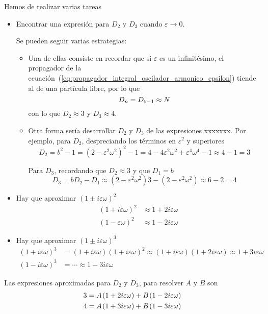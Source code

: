 Hemos de realizar varias tareas
\begin{itemize}
\item Encontrar una expresión para $D_2$ y $D_3$ cuando
  $\varepsilon \rightarrow 0$.

  Se pueden seguir varias estrategias:
  \begin{itemize}
  \item Una de ellas consiste en recordar que si $\varepsilon$ es un
    infinitésimo, el propagador de la
    ecuación~(\ref{eq:propagador_integral_oscilador_armonico_epsilon})
    tiende al de una partícula libre, por lo que
    \[
      D_n = D_{\textsc{n}-1} \approx N
    \]
    con lo que $D_2\approx 3$ y $D_3\approx 4$.

    \item
    Otra forma sería desarrollar $D_2$ y $D_3$ de las expresiones xxxxxxx.
    Por ejemplo, para $D_2$, despreciando los términos en
    $\varepsilon^2$ y superiores
    \[
      D_2 = b^2 - 1 = (2-\varepsilon^2\omega^2)^2-1
      = 4 -4\varepsilon^2\omega^2 + \varepsilon^4\omega^4 -1 
      \approx
      4 - 1
      = 3
    \]

    Para $D_3$, recordando que $D_2\approx 3$ y que $D_1= b$
    \[
      D_3
      = b D_2 - D_1
      \approx
      (2-\varepsilon^2\omega^2) 3 - (2-\varepsilon^2\omega^2)
      \approx
      6 - 2
      = 4
    \]
  \end{itemize}

\item Hay que aproximar $(1\pm i\varepsilon\omega)^2$
  \begin{align*}
    (1+i\varepsilon\omega)^2
    &\approx
    1 + 2i\varepsilon\omega\\
    (1-\varepsilon\omega)^2
    &\approx
    1 - 2i\varepsilon\omega
  \end{align*}

\item Hay que aproximar $(1\pm i\varepsilon\omega)^3$
  \begin{align*}
    (1+i\varepsilon\omega)^3
    &= (1+i\varepsilon\omega) (1+i\varepsilon\omega)^2
    \approx (1+i\varepsilon\omega) (1+2i\varepsilon\omega)
      \approx 1+3i\varepsilon\omega\\
    (1-i\varepsilon\omega)^3
    &= \cdots
    \approx
    1-3i\varepsilon\omega
  \end{align*}
\end{itemize}

Las expresiones aproximadas para $D_2$ y $D_3$, para resolver $A$ y $B$ son
  \begin{align*}
    3 &= A\kern1pt (1+2i\varepsilon\omega) + B\kern1pt (1-2i\varepsilon\omega)\\
    4 &= A\kern1pt (1+3i\varepsilon\omega) + B\kern1pt (1-3i\varepsilon\omega)
  \end{align*}



